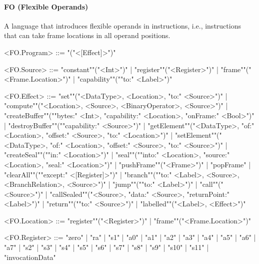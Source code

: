 \documentclass[main.tex]{subfiles}
\begin{document}
\paragraph{ FO (Flexible Operands) } A language that introduces flexible operands in instructions, i.e., instructions that can take frame locations in all operand positions.
\begin{grammar}
	\footnotesize
				<FO.Program> ::=
							"("<[Effect]>")"
				\par
				<FO.Source> ::=
						"constant""("<Int>")"
						| "register""("<Register>")"
						| "frame""("<Frame.Location>")"
						| "capability""(""to:" <Label>")"
				\par
				<FO.Effect> ::=
						"set""("<DataType>, <Location>, "to:" <Source>")"
						| "compute""("<Location>, <Source>, <BinaryOperator>, <Source>")"
						| "createBuffer""(""bytes:" <Int>, "capability:" <Location>, "onFrame:" <Bool>")"
						| "destroyBuffer""(""capability:" <Source>")"
						| "getElement""("<DataType>, "of:" <Location>, "offset:" <Source>, "to:" <Location>")"
						| "setElement""("<DataType>, "of:" <Location>, "offset:" <Source>, "to:" <Source>")"
						| "createSeal""(""in:" <Location>")"
						| "seal""(""into:" <Location>, "source:" <Location>, "seal:" <Location>")"
						| "pushFrame""("<Frame>")"
						| "popFrame"
						| "clearAll""(""except:" <[Register]>")"
						| "branch""(""to:" <Label>, <Source>, <BranchRelation>, <Source>")"
						| "jump""(""to:" <Label>")"
						| "call""("<Source>")"
						| "callSealed""("<Source>, "data:" <Source>, "returnPoint:" <Label>")"
						| "return""(""to:" <Source>")"
						| "labelled""("<Label>, <Effect>")"
				\par
				<FO.Location> ::=
						"register""("<Register>")"
						| "frame""("<Frame.Location>")"
				\par
				<FO.Register> ::=
						"zero"
						| "ra"
						| "s1"
						| "a0"
						| "a1"
						| "a2"
						| "a3"
						| "a4"
						| "a5"
						| "a6"
						| "a7"
						| "s2"
						| "s3"
						| "s4"
						| "s5"
						| "s6"
						| "s7"
						| "s8"
						| "s9"
						| "s10"
						| "s11"
						| "invocationData"
				\par
\end{grammar}
\par
\end{document}
